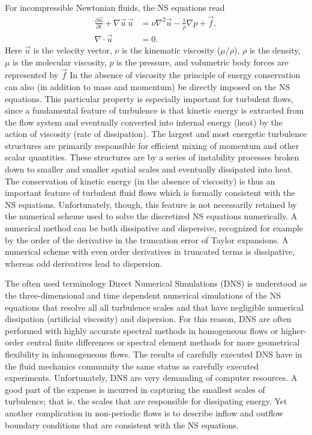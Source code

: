 For incompressible Newtonian fluids, the NS equations read
\begin{align}
 \frac{\partial \vec{u}}{\partial t}+\nabla \vec{u} \,  \vec{u}
      &= \nu \nabla^2 \vec{u} -\frac{1}{\rho} \nabla p +\vec{f}, \label{eq:mortensen:NS}
\\
 \nabla \cdot \vec{u} &=0.
 \label{eq:mortensen:cont}
\end{align}
Here $\vec{u}$ is the velocity vector, $\nu$ is the kinematic viscosity
($\mu/\rho$), $\rho$ is the density, $\mu$ is the molecular viscosity, $p$
is the pressure, and volumetric body forces are represented by $\vec{f}$
In the absence of viscosity the principle
of energy conservation can also (in addition to mass and momentum)
be directly imposed on the NS equations. This particular property is
especially important for turbulent flows, since a fundamental feature
of turbulence is that kinetic energy is extracted from the flow system
and eventually converted into internal energy (heat) by the action of
viscosity (rate of dissipation). The largest and most energetic turbulence
structures are primarily responsible for efficient mixing of momentum
and other scalar quantities. These structures are by a series of instability
processes broken down to smaller and smaller spatial scales and eventually
dissipated into heat. The conservation of kinetic energy (in the absence
of viscosity) is thus an important feature of turbulent fluid flows which
is formally consistent with the NS equations. Unfortunately, though,
this feature is not necessarily retained by the numerical scheme used to
solve the discretized NS equations numerically. A numerical method can be
both dissipative and dispersive, recognized for example by the order of
the derivative in the truncation error of Taylor expansions. A numerical
scheme with even order derivatives in truncated terms is dissipative,
whereas odd derivatives lead to dispersion.

The often used terminology Direct Numerical Simulations (DNS) is
understood as the three-dimensional and time dependent numerical
simulations of the NS equations that resolve all all turbulence scales
and that have negligible numerical
dissipation (artificial viscosity) and dispersion. For this reason,
DNS are often performed with highly accurate spectral
methods \citep{CanutoHussainiQuarteroniEtAl2007} in homogeneous
flows or higher-order central finite differences or spectral element
methods \citep{Blackburn2009} for more geometrical flexibility in
inhomogeneous flows. The results of carefully executed DNS have in
the fluid mechanics community the same status as carefully executed
experiments. Unfortunately, DNS are very demanding of computer
resources. A good part of the expense is incurred in capturing the
smallest scales of turbulence; that is, the scales that are responsible
for dissipating energy. Yet another complication in non-periodic flows
is to describe inflow and outflow boundary conditions that are consistent
with the NS equations.

